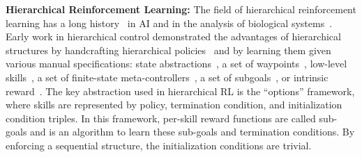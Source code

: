 \vspace{0.5em}\noindent\textbf{Hierarchical Reinforcement Learning: } 
The field of hierarchical reinforcement learning has a long history~\citep{parr98,suttonPS99,barto03} in AI and in the analysis of biological systems~\citep{botvinick08,botvinick2009hierarchically,solway2014optimal,zacksKEH11,whitenFBL06}.
Early work in hierarchical control demonstrated the advantages of hierarchical structures by handcrafting hierarchical policies~\citep{brooks1986robust} and by learning them given various manual specifications: state abstractions~\citep{dayanH92,hengst02,kolterAN07,konidarisB07}, a set of waypoints~\citep{kaelbling93}, low-level skills~\citep{huberG97,baconP15,liaw17composing}, a set of finite-state meta-controllers~\citep{parrR97}, a set of subgoals~\citep{suttonPS99,dietterich00}, or intrinsic reward~\citep{kulkarni2016hierarchical}.
The key abstraction used in hierarchical RL is the ``options'' framework, where skills are represented by policy, termination condition, and initialization condition triples.
In this framework, per-skill reward functions are called sub-goals and \hirl is an algorithm to learn these sub-goals and termination conditions. 
By enforcing a sequential structure, the initialization conditions are trivial.

